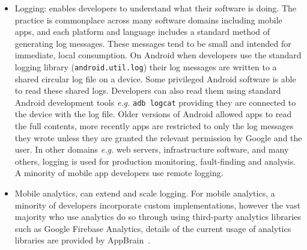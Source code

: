 \begin{itemize}
    \item Logging: enables developers to understand what their software is doing. The practice is commonplace across many software domains including mobile apps, and each platform and language includes a standard method of generating log messages. These messages tend to be small and intended for immediate, local consumption. On Android when developers use the standard logging library (\texttt{android.util.log}) their log messages are written to a shared circular log file on a device. Some privileged Android software is able to read these shared logs. Developers can also read them using standard Android development tools \emph{e.g.} \texttt{adb logcat} providing they are connected to the device with the log file. Older versions of Android allowed apps to read the full contents, more recently apps are restricted to only the log messages they wrote unless they are granted the relevant permission by Google and the user. 
    In other domains \emph{e.g.} web servers, infrastructure software, and many others, logging is used for production monitoring, fault-finding and analysis. A minority of mobile app developers use remote logging.
    \item Mobile analytics, can extend and scale logging. For mobile analytics, a minority of developers incorporate custom implementations, however the vast majority who use analytics do so through using third-party analytics libraries such as Google Firebase Analytics, details of the current usage of analytics libraries are provided by AppBrain~.
\end{itemize}



